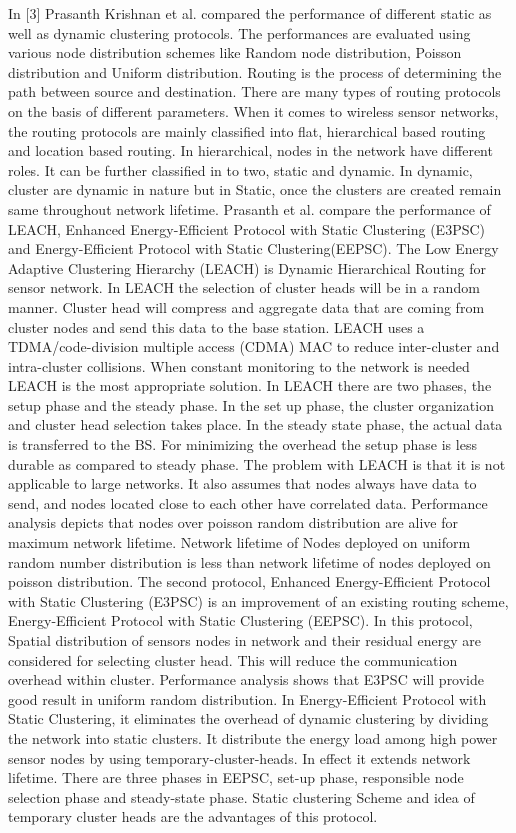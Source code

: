 \documentclass[MTech]{iitmdiss}
\begin{document}
In [3]  Prasanth Krishnan et al. compared the performance of different static as well as dynamic clustering protocols. The performances are evaluated using various node distribution schemes like Random node distribution, Poisson distribution and Uniform distribution. Routing is the process of determining the path between source and destination. There are many types of routing protocols on the basis of different parameters. When it comes to wireless sensor networks, the routing protocols are mainly classified into flat, hierarchical based routing and location based routing. In hierarchical, nodes in the network have different roles. It can be further classified in to two, static and dynamic. In dynamic, cluster are dynamic in nature but in Static, once the clusters are created remain same throughout  network lifetime. Prasanth et al. compare the  performance of LEACH,  Enhanced  Energy-Efficient Protocol with Static Clustering (E3PSC) and Energy-Efficient Protocol with Static Clustering(EEPSC). The Low Energy Adaptive Clustering Hierarchy (LEACH)  is Dynamic Hierarchical  Routing for sensor  network. In LEACH the selection of cluster heads will be in a random manner. Cluster head will compress and aggregate data that are coming from cluster nodes and send this data to the base station. LEACH uses a TDMA/code-division multiple access (CDMA) MAC to reduce inter-cluster and intra-cluster collisions. When constant monitoring to the network is needed LEACH is the most appropriate solution. In LEACH there are two phases, the setup phase and the steady phase. In the set up phase, the cluster  organization  and cluster head selection takes place. In the steady state phase, the actual data is  transferred  to the BS. For minimizing the overhead the setup phase is less durable as compared to steady phase. The problem with LEACH is that it is not applicable to large networks. It also assumes that nodes always have data  to send, and nodes located close to each other have  correlated  data. Performance analysis depicts that nodes over poisson  random distribution are alive for maximum network lifetime. Network lifetime of  Nodes deployed on uniform random number distribution is less than network lifetime of nodes deployed on poisson distribution. The second protocol, Enhanced  Energy-Efficient Protocol with Static Clustering  (E3PSC)  is an improvement of an existing routing scheme, Energy-Efficient Protocol with  Static Clustering (EEPSC). In this protocol, Spatial distribution of sensors nodes in network and their  residual  energy are considered for selecting cluster head. This will  reduce the  communication overhead within cluster. Performance analysis shows that  E3PSC  will provide good result in uniform random distribution. In  Energy-Efficient Protocol with Static Clustering, it eliminates the overhead of dynamic clustering  by dividing the network into static clusters. It distribute the energy load among high power sensor nodes by using temporary-cluster-heads. In effect it  extends network lifetime. There are three phases in EEPSC, set-up phase, responsible node selection phase and steady-state phase. Static clustering Scheme and  idea of temporary cluster heads  are the advantages of this protocol.
\end{document}
